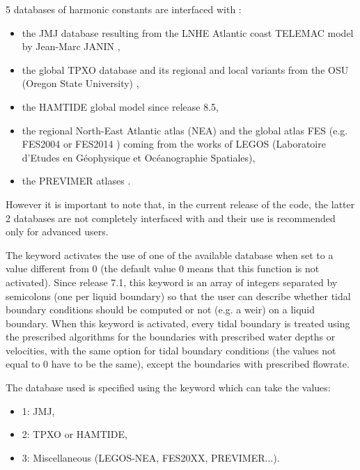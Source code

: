 5 databases of harmonic constants are interfaced with :

\begin{itemize}
\item the JMJ database resulting from the LNHE Atlantic coast TELEMAC model by
Jean-Marc JANIN \cite{Janin1992},

\item the global TPXO database and its regional and local variants from the OSU
(Oregon State University) \cite{Egbert2022},

\item the HAMTIDE global model \cite{Taguchi2014} since release 8.5,

\item the regional North-East Atlantic atlas (NEA) \cite{Pairaud2008,Pairaud2010}
and the global atlas FES
(e.g. FES2004 or FES2014 \cite{Lyard2021}) coming from the works of LEGOS
(Laboratoire d'Etudes en G\'{e}ophysique et Oc\'{e}anographie Spatiales),

\item the PREVIMER atlases \cite{Pineau2013}.
\end{itemize}

However it is important to note that, in the current release of the code,
the latter 2 databases are not completely interfaced with 
and their use is recommended only for advanced users.

The keyword  activates the use of
one of the available database when set to a value different from 0
(the default value 0 means that this function is not activated).
Since release 7.1, this keyword is an array of integers separated by semicolons
(one per liquid boundary) so that the user can describe whether tidal boundary
conditions should be computed or not (e.g. a weir) on a liquid boundary.
When this keyword is activated, every tidal
boundary is treated using the prescribed algorithms for the boundaries with
prescribed water depths or velocities, with the same option for tidal boundary
conditions (the values not equal to 0 have to be the same),
except the boundaries with prescribed flowrate.

The database used is specified using the keyword 
which can take the values:

\begin{itemize}
\item 1: JMJ,

\item 2: TPXO or HAMTIDE,

\item 3: Miscellaneous (LEGOS-NEA, FES20XX, PREVIMER...).
\end{itemize}

